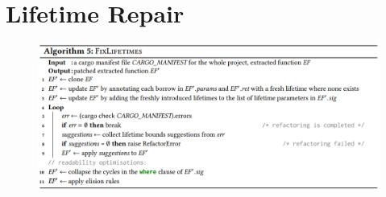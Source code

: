 \section{Lifetime Repair \cite{AdventureOfALifetime}}
\label{app:lifetime_repair}


\begin{figure}[h!]
    \centering
    \includegraphics[width=\textwidth]{figures/algo_5.png}
    \label{fig:algo_5}
\end{figure}